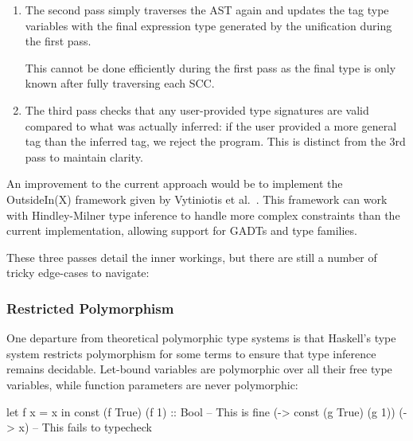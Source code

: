 \documentclass[dissertation.tex]{subfiles}
\begin{document}
{{\begin{enumerate}
{            After all declarations in an SCC have been fully traversed, types are generated for all the variable names bound. This involves adding explicit quantifiers and constraints to the simple type inferred for the top-level expression on the right-hand side of the binding. All type variables within the simple type that are not already in scope from eg.\ a class definition are added as universally quantified variables, and any constraints generated during processing the declaration involving type variables free in the simple type, are added as the qualifiers to the type.
        }
        \item
        {
            The second pass simply traverses the AST again and updates the tag type variables with the final expression type generated by the unification during the first pass.
            
            This cannot be done efficiently during the first pass as the final type is only known after fully traversing each SCC.
        }
        \item
        {
            The third pass checks that any user-provided type signatures are valid compared to what was actually inferred: if the user provided a more general tag than the inferred tag, we reject the program. This is distinct from the 3rd pass to maintain clarity.
        }
        \end{enumerate}

        An improvement to the current approach would be to implement the OutsideIn(X) framework given by Vytiniotis et al.\ \cite{OutsideIn}. This framework can work with Hindley-Milner type inference to handle more complex constraints than the current implementation, allowing support for GADTs and type families.

        These three passes detail the inner workings, but there are still a number of tricky edge-cases to navigate:

        \subsubsection*{Restricted Polymorphism}
        {
            One departure from theoretical polymorphic type systems is that Haskell's type system restricts polymorphism for some terms to ensure that type inference remains decidable. Let-bound variables are polymorphic over all their free type variables, while function parameters are never polymorphic:

            \begin{haskellfigure}
            let f x = x in const (f True) (f 1) :: Bool -- This is fine
            (\g -> const (g True) (g 1)) (\x -> x)      -- This fails to typecheck
            \end{haskellfigure}
        }
}}
\end{document}
